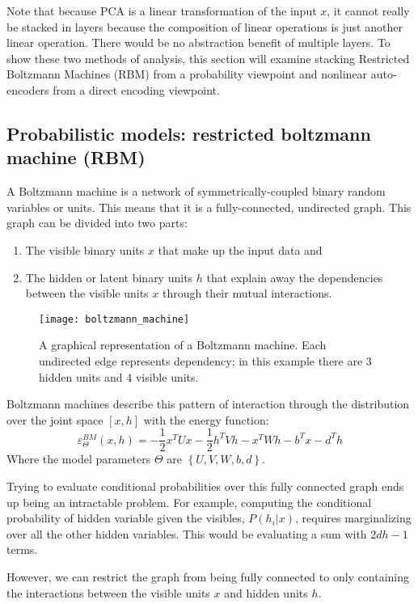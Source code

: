 Note that because PCA is a linear transformation of the input \(x\), it cannot really be stacked in layers because the composition of linear operations is just another linear operation. There would be no abstraction benefit of multiple layers. To show these two methods of analysis, this section will examine stacking Restricted Boltzmann Machines (RBM) from a probability viewpoint and nonlinear auto-encoders from a direct encoding viewpoint.

\subsection{Probabilistic models: restricted boltzmann machine (RBM)}
A Boltzmann machine is a network of symmetrically-coupled binary random variables or units. This means that it is a fully-connected, undirected graph. This graph can be divided into two parts:

\begin{enumerate}
\item The visible binary units \(x\) that make up the input data and
\item The hidden or latent binary units \(h\) that explain away the dependencies between the visible units \(x\) through their mutual interactions.
\end{enumerate}

\begin{figure}[h!]
  \centering
    \texttt{[image: boltzmann\_machine]}
\caption{A graphical representation of a Boltzmann machine. Each undirected edge represents dependency; in this example there are 3 hidden units and 4 visible units.}
\end{figure}

Boltzmann machines describe this pattern of interaction through the distribution over the joint space \([x,h]\) with the energy function: 
\[\varepsilon_\Theta^{BM} (x,h) = -\frac{1}{2} x^T Ux - \frac{1}{2} h^T Vh - x^T Wh - b^T x - d^T h\]
Where the model parameters \(\Theta\) are \(\left\{U,V,W,b,d\right\}\).

Trying to evaluate conditional probabilities over this fully connected graph ends up being an intractable problem. For example, computing the conditional probability of hidden variable given the visibles, \(P(h_i | x)\), requires marginalizing over all the other hidden variables. This would be evaluating a sum with \(2dh - 1\) terms.

However, we can restrict the graph from being fully connected to only containing the interactions between the visible units \(x\) and hidden units \(h\). 

